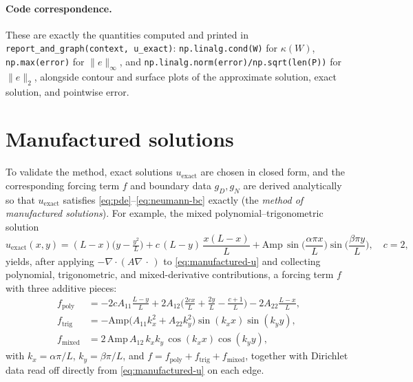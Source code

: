 \documentclass[11pt]{article}
\newcommand{\diver}{\nabla\!\cdot}
\newcommand{\grad}{\nabla}
\begin{document}
\paragraph{Code correspondence.}
These are exactly the quantities computed and printed in \\
\texttt{report\_and\_graph(context, u\_exact)}: \texttt{np.linalg.cond(W)}
for $\kappa(W)$, \texttt{np.max(error)} for $\|e\|_\infty$, and
\texttt{np.linalg.norm(error)/np.sqrt(len(P))} for $\|e\|_2$, alongside
contour and surface plots of the approximate solution, exact solution,
and pointwise error.

\section{Manufactured solutions}
\label{sec:manufactured}

To validate the method, exact solutions $u_{\text{exact}}$ are chosen
in closed form, and the corresponding forcing term $f$ and boundary
data $g_D, g_N$ are derived analytically so that $u_{\text{exact}}$
satisfies \eqref{eq:pde}--\eqref{eq:neumann-bc} exactly (the
\emph{method of manufactured solutions}). For example, the
mixed polynomial--trigonometric solution
\begin{equation}
  u_{\text{exact}}(x,y) =
  (L-x)\Big(y - \tfrac{y^2}{L}\Big)
  + c\,(L-y)\,\frac{x(L-x)}{L}
  + \mathrm{Amp}\,\sin\!\Big(\frac{\alpha\pi x}{L}\Big)
  \sin\!\Big(\frac{\beta\pi y}{L}\Big),
  \quad c=2,
  \label{eq:manufactured-u}
\end{equation}
yields, after applying $-\diver(A\grad\,\cdot\,)$ to
\eqref{eq:manufactured-u} and collecting polynomial, trigonometric, and
mixed-derivative contributions, a forcing term $f$ with three additive
pieces:
\begin{align}
  f_{\text{poly}} &= -2cA_{11}\frac{L-y}{L}
  + 2A_{12}\Big(\frac{2cx}{L} + \frac{2y}{L} - \frac{c+1}{L}\Big)
  - 2A_{22}\frac{L-x}{L}, \\
  f_{\text{trig}} &= -\mathrm{Amp}\Big(A_{11}k_x^2 + A_{22}k_y^2\Big)
  \sin(k_x x)\sin(k_y y), \\
  f_{\text{mixed}} &= 2\,\mathrm{Amp}\,A_{12}\,k_x k_y\,\cos(k_x x)\cos(k_y y),
  \label{eq:manufactured-f}
\end{align}
with $k_x = \alpha\pi/L$, $k_y = \beta\pi/L$, and $f = f_{\text{poly}} +
f_{\text{trig}} + f_{\text{mixed}}$, together with Dirichlet data read
off directly from \eqref{eq:manufactured-u} on each edge.
\end{document}
